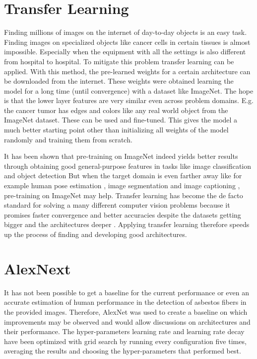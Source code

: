 \section{Transfer Learning}

Finding millions of images on the internet of day-to-day objects is an easy task. Finding images on specialized objects like cancer cells in certain tissues is almost impossible. Especially when the equipment with all the settings is also different from hospital to hospital. To mitigate this problem transfer learning can be applied. With this method, the pre-learned weights for a certain architecture can be downloaded from the internet. These weights were obtained learning the model for a long time (until convergence) with a dataset like ImageNet. The hope is that the lower layer features are very similar even across problem domains. E.g. the cancer tumor has edges and colors like any real world object from the ImageNet dataset. These can be used and fine-tuned. This gives the model a much better starting point other than initializing all weights of the model randomly and training them from scratch.

It has been shown that pre-training on ImageNet indeed yields better results through obtaining good general-purpose features in tasks like image classification \cite{sharif2014cnn} and object detection \cite{girshick2014rich, sermanet2013overfeat} But when the target domain is even farther away like for example human pose estimation \cite{carreira2016human}, image segmentation \cite{dai2016instance} and image captioning \cite{donahue2015long, karpathy2015deep}, pre-training on ImageNet may help. Transfer learning has become the de facto standard for solving a many different computer vision problems because it promises faster convergence and better accuracies despite the datasets getting bigger and the architectures deeper \cite{huh2016makes}. Applying transfer learning therefore speeds up the process of finding and developing good architectures.

\section{AlexNext}

It has not been possible to get a baseline for the current performance or even an accurate estimation of human performance in the detection of asbestos fibers in the provided images. Therefore, AlexNet was used to create a baseline on which improvements may be observed and would allow discussions on architectures and their performance. The hyper-parameters learning rate and learning rate decay have been optimized with grid search by running every configuration five times, averaging the results and choosing the hyper-parameters that performed best.

